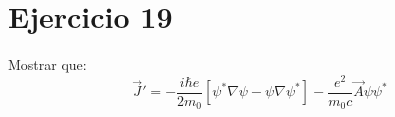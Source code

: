 \section*{Ejercicio 19}
Mostrar que:
\begin{equation*}
    {\vec{J}}' = -\frac{i\hbar e}{2m_0} \left[\psi^* \nabla \psi - \psi \nabla \psi^*  \right] - \frac{e^2}{m_0c} \vec{A} \psi \psi^*
\end{equation*}